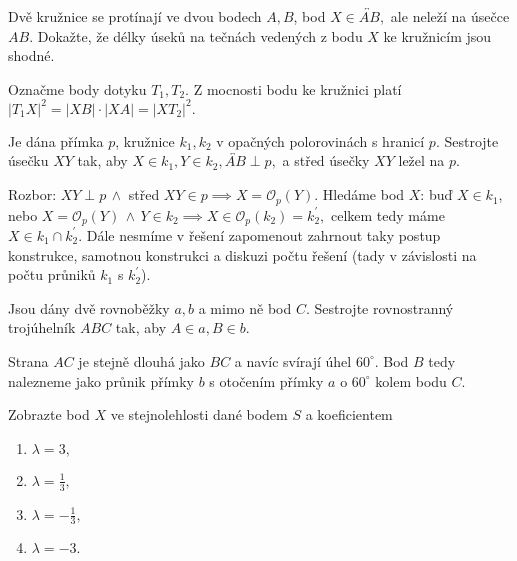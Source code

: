 \begin{priklad}
Dvě kružnice se protínají ve dvou bodech $A,B$, bod $X \in \overleftrightarrow{AB},$
ale neleží na úsečce $AB$. Dokažte, že délky úseků na tečnách vedených z bodu $X$
ke kružnicím jsou shodné.
\end{priklad}

\begin{reseni}
Označme body dotyku $T_1,T_2.$ Z mocnosti bodu ke kružnici platí
$|T_1X|^2=|XB|\cdot |XA|=|XT_2|^2.$
\end{reseni}

\begin{priklad}
Je dána přímka $p$, kružnice $k_1, k_2$ v opačných polorovinách s hranicí $p.$
Sestrojte úsečku $XY$ tak, aby $X\in k_1, Y\in k_2, \overleftrightarrow{AB} \perp p,$ a
střed úsečky $XY$ ležel na $p.$
\end{priklad}

\begin{reseni}
Rozbor: $XY\perp p \, \land$ střed $XY\in p \implies X=\mathcal O_p(Y)$. Hledáme
bod $X$: buď $X \in k_1$, nebo $X=\mathcal O_p(Y) \, \land \, Y \in k_2 \implies X \in \mathcal O_p(k_2)=k_2^\prime,$ celkem
tedy máme $X\in k_1\cap k_2^\prime.$ Dále nesmíme v řešení zapomenout zahrnout taky postup
konstrukce, samotnou konstrukci a diskuzi počtu řešení (tady v závislosti na
počtu průniků $k_1$ s $k_2^\prime$).
\end{reseni}

\begin{priklad}
Jsou dány dvě rovnoběžky $a,b$ a mimo ně bod $C$. Sestrojte rovnostranný
trojúhelník $ABC$ tak, aby $A \in a, B \in b$.
\end{priklad}

\begin{reseni}
Strana $AC$ je stejně dlouhá jako $BC$ a navíc svírají úhel $60^\circ$. Bod
$B$ tedy nalezneme jako průnik přímky $b$ s otočením přímky $a$ o $60^\circ$ kolem
bodu $C.$
\end{reseni}

\begin{priklad}
Zobrazte bod $X$ ve stejnolehlosti dané bodem $S$ a koeficientem
\begin{enumerate}[$i.$]
\item $\lambda = 3,$
\item $\lambda = \frac{1}{3},$
\item $\lambda = -\frac{1}{3},$
\item $\lambda = -3.$
\end{enumerate}
\end{priklad}

